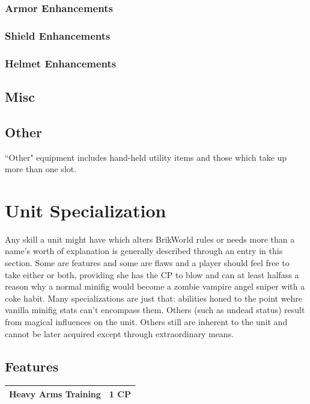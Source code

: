 \documentclass[12pt,a4paper,twocolumn]{article}
\begin{document}
\subsubsection{Armor Enhancements}

\subsubsection{Shield Enhancements}

\subsubsection{Helmet Enhancements}

\subsection{Misc}

\subsection{Other}

``Other" equipment includes hand-held utility items and those which take up more than one slot.

\section{Unit Specialization}

Any skill a unit might have which alters BrikWorld rules or needs more than a name's worth of explanation is generally described through an entry in this section.  Some are features and some are flaws and a player should feel free to take either or both, providing she has the CP to blow and can at least halfass a reason why a normal minifig would become a zombie vampire angel sniper with a coke habit.  Many specializations are just that: abilities honed to the point wehre vanilla minifig stats can't encompass them.  Others (such as undead status) result from magical influences on the unit.  Others still are inherent to the unit and cannot be later acquired except through extraordinary means.

\subsection{Features}

\begin{tabular}{|l|c|} \hline
Heavy Arms Training & 1 CP \\ \hline
\end{tabular}
\end{document}

